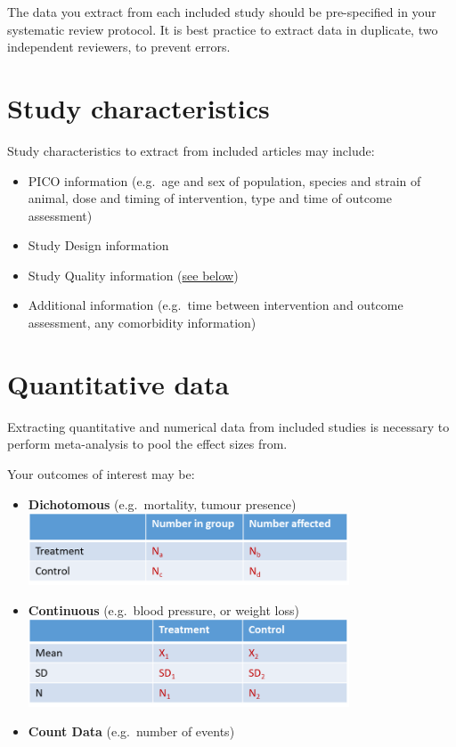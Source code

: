 \documentclass[
]{book}
\providecommand{\tightlist}{%
  \setlength{\itemsep}{0pt}\setlength{\parskip}{0pt}}
\begin{document}
The data you extract from each included study should be pre-specified in your systematic review protocol. It is best practice to extract data in duplicate, two independent reviewers, to prevent errors.

\hypertarget{study-characteristics}{%
\section{Study characteristics}\label{study-characteristics}}

Study characteristics to extract from included articles may include:

\begin{itemize}
\tightlist
\item
  PICO information (e.g.~age and sex of population, species and strain of animal, dose and timing of intervention, type and time of outcome assessment)
\item
  Study Design information
\item
  Study Quality information (\protect\hyperlink{Quality-Assessment}{see below})
\item
  Additional information (e.g.~time between intervention and outcome assessment, any comorbidity information)
\end{itemize}

\hypertarget{quantitative-data}{%
\section{Quantitative data}\label{quantitative-data}}

Extracting quantitative and numerical data from included studies is necessary to perform meta-analysis to pool the effect sizes from.

Your outcomes of interest may be:

\begin{itemize}
\item
  \textbf{Dichotomous} (e.g.~mortality, tumour presence) \includegraphics[width=0.75\textwidth,height=0.75\textheight]{figs/dichot-outcome.png}
\item
  \textbf{Continuous} (e.g.~blood pressure, or weight loss) \includegraphics[width=0.75\textwidth,height=0.75\textheight]{figs/contin-outcome.png}
\item
  \textbf{Count Data} (e.g.~number of events)
\end{itemize}
\end{document}
